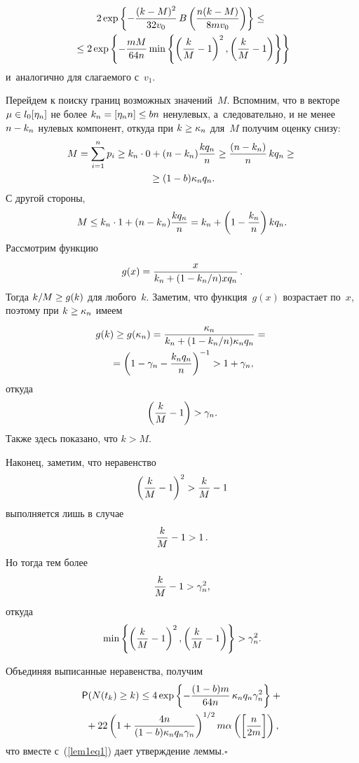 \begin{multicols}{2}
\noindent
\begin{multline*}
2 \exp\left\{-\fr{(k-M)^2}{32 v_0}\, B\left(\fr{n(k-M)}{8m  v_0}\right)\right\} \leq{}\\
{}\leq 2 \exp\left\{-\fr{mM}{64n}
\min\left\{\left(\fr{k}{M}-1\right)^2,\left(\fr{k}{M}- 1\right)\right\}\right\}
\end{multline*}
и~аналогично для слагаемого с~$v_1$.

Перейдем к поиску границ возможных значений~$M$. Вспомним, что в векторе $\mu\hm\in 
l_0[\eta_n]$ не более $k_n \hm= [\eta_n n] \leq bn$ ненулевых, а~следовательно, и 
не менее $n\hm-k_n$ нулевых компонент, откуда при $k\hm\geq \kappa_n$ для~$M$ получим 
оценку снизу:
\begin{multline*}
M = \sum\limits_{i=1}^n p_i \geq k_n \cdot 0 + (n-k_n)  \fr{kq_n}{n} 
\geq   \fr{(n-k_n)}{n}\, kq_n \geq{}\\
{}\geq (1-b)\kappa_n q_n.
\end{multline*}
С другой стороны,
$$
M \leq k_n \cdot 1 + (n-k_n)  \fr{kq_n}{n} =  k_n + \left(1-\fr{k_n}{n}\right) k q_n.
$$
Рассмотрим функцию 
$$
g(x) = \fr{x}{k_n \hm+ (1\hm-k_n/n) x q_n}\,.
$$
 Тогда $k/M \hm\geq g(k)$ для 
любого~$k$. Заметим, что функция~$g(x)$ возрастает по~$x$, поэтому при 
$k\hm\geq\kappa_n$ имеем
\begin{multline*}
g(k) \geq g(\kappa_n) =\fr{\kappa_n}{k_n+ (1-k_n/n) \kappa_n q_n} ={}\\
{}= \left(1- \gamma_n- \fr{k_n q_n}{n}\right)^{-1} > 1 + \gamma_n,
\end{multline*}
откуда
$$
\left(\fr{k}{M}-1\right) > \gamma_n.
$$
Также здесь показано, что $k>M$.

\columnbreak

Наконец, заметим, что неравенство 
$$
\left(\fr{k}{M}-1\right)^2 > \fr{k}{M}-1
$$
выполняется лишь в случае 
$$
\fr{k}{M}-1 > 1\,.
$$
 Но тогда тем более 
 $$
 \fr{k}{M}- 1>\gamma_n^2,
 $$
  откуда
$$
\min\left\{\left(\fr{k}{M}-1\right)^2,\left(\fr{k}{M}-1\right)\right\}  > \gamma_n^2.
$$

Объединяя выписанные неравенства, получим
\begin{multline*}
\p(N(t_k)\geq k) \leq 4 \exp\left\{-\fr{(1-b)m}{64n}\,  \kappa_n q_n  \gamma_n^2    \right\}+ {}\\
{}+ 22\left(1+\fr{4n}{(1-b)\kappa_n q_n 
\gamma_n}\right)^{1/2} m \alpha\left(\left[\fr{n}{2m}\right]\right),
\end{multline*}
что вместе с~(\ref{lem1eq1}) дает утверждение леммы.\hfill$\square$


\end{multicols}

